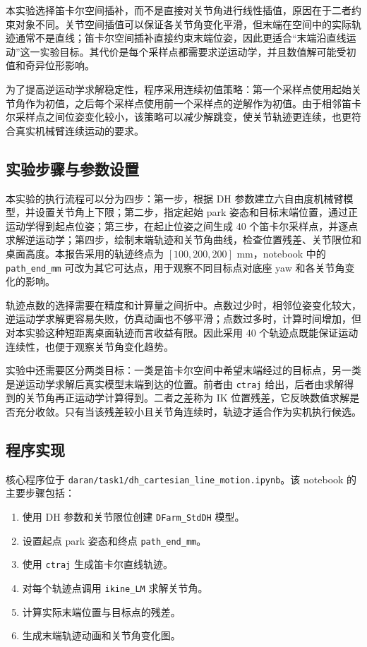本实验选择笛卡尔空间插补，而不是直接对关节角进行线性插值，原因在于二者约束对象不同。关节空间插值可以保证各关节角变化平滑，但末端在空间中的实际轨迹通常不是直线；笛卡尔空间插补直接约束末端位姿，因此更适合“末端沿直线运动”这一实验目标。其代价是每个采样点都需要求逆运动学，并且数值解可能受初值和奇异位形影响。

为了提高逆运动学求解稳定性，程序采用连续初值策略：第一个采样点使用起始关节角作为初值，之后每个采样点使用前一个采样点的逆解作为初值。由于相邻笛卡尔采样点之间位姿变化较小，该策略可以减少解跳变，使关节轨迹更连续，也更符合真实机械臂连续运动的要求。

\subsection{实验步骤与参数设置}

本实验的执行流程可以分为四步：第一步，根据 DH 参数建立六自由度机械臂模型，并设置关节角上下限；第二步，指定起始 park 姿态和目标末端位置，通过正运动学得到起点位姿；第三步，在起止位姿之间生成 40 个笛卡尔采样点，并逐点求解逆运动学；第四步，绘制末端轨迹和关节角曲线，检查位置残差、关节限位和桌面高度。本报告采用的轨迹终点为 \([100,200,200]\) mm，notebook 中的 \texttt{path\_end\_mm} 可改为其它可达点，用于观察不同目标点对底座 yaw 和各关节角变化的影响。

轨迹点数的选择需要在精度和计算量之间折中。点数过少时，相邻位姿变化较大，逆运动学求解更容易失败，仿真动画也不够平滑；点数过多时，计算时间增加，但对本实验这种短距离桌面轨迹而言收益有限。因此采用 40 个轨迹点既能保证运动连续性，也便于观察关节角变化趋势。

实验中还需要区分两类目标：一类是笛卡尔空间中希望末端经过的目标点，另一类是逆运动学求解后真实模型末端到达的位置。前者由 \texttt{ctraj} 给出，后者由求解得到的关节角再正运动学计算得到。二者之差称为 IK 位置残差，它反映数值求解是否充分收敛。只有当该残差较小且关节角连续时，轨迹才适合作为实机执行候选。

\subsection{程序实现}

核心程序位于 \texttt{daran/task1/dh\_cartesian\_line\_motion.ipynb}。该 notebook 的主要步骤包括：

\begin{enumerate}
  \item 使用 DH 参数和关节限位创建 \texttt{DFarm\_StdDH} 模型。
  \item 设置起点 park 姿态和终点 \texttt{path\_end\_mm}。
  \item 使用 \texttt{ctraj} 生成笛卡尔直线轨迹。
  \item 对每个轨迹点调用 \texttt{ikine\_LM} 求解关节角。
  \item 计算实际末端位置与目标点的残差。
  \item 生成末端轨迹动画和关节角变化图。
\end{enumerate}

